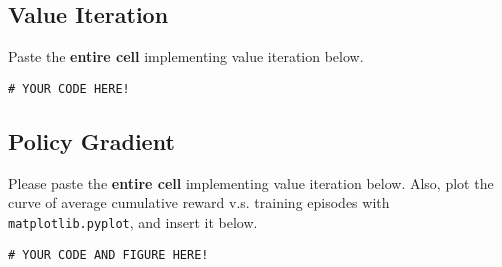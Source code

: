 \documentclass[12pt]{article}
\begin{document}
\subsection*{Value Iteration}
Paste the \textbf{entire cell}  implementing value iteration below.
\begin{solution}
    \begin{verbatim}
# YOUR CODE HERE!
    \end{verbatim}
\end{solution}
\subsection*{Policy Gradient}
Please paste the \textbf{entire cell}  implementing value iteration below. Also, plot the curve of average cumulative reward v.s. training episodes with \texttt{matplotlib.pyplot}, and insert it below. 
\begin{solution}
    \begin{verbatim}
# YOUR CODE AND FIGURE HERE!
    \end{verbatim}
\end{solution}
\end{document}
